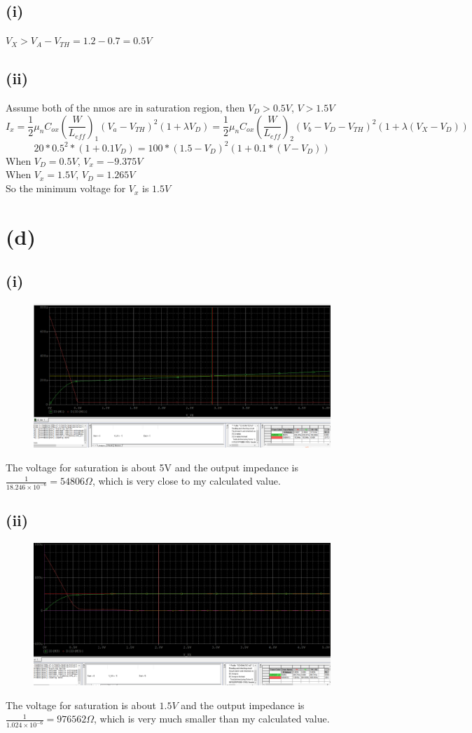 \documentclass[12pt]{article}
\begin{document}
\subsection{(i)}
$V_X>V_A-V_{TH}=1.2-0.7=0.5V$
\subsection{(ii)}
Assume both of the nmos are in saturation region, then $V_D>0.5V$, $V>1.5V$
$$I_x=\frac{1}{2}\mu_nC_{ox}(\frac{W}{L_{eff}})_1(V_{a}-V_{TH})^2(1+\lambda V_D)=\frac{1}{2}\mu_nC_{ox}(\frac{W}{L_{eff}})_2(V_{b}-V_{D}-V_{TH})^2(1+\lambda (V_X-V_D))$$
$$20*0.5^2*(1+0.1V_D)=100*(1.5-V_D)^2(1+0.1*(V-V_D))$$
When $V_D=0.5V$, $V_x=-9.375V$
\\ When $V_x=1.5V$, $V_D=1.265V$
\\ So the minimum voltage for $V_x$ is $1.5V$
\section{(d)}
\subsection{(i)}
\begin{figure}[H]
\centering
\includegraphics[scale=0.25]{P1.png}
\end{figure}
The voltage for saturation is about 5V and the output impedance is $\frac{1}{18.246\times10^{-6}}=54806\Omega$, which is very close to my calculated value.
\subsection{(ii)}
\begin{figure}[H]
\centering
\includegraphics[scale=0.25]{P2.png}
\end{figure}
The voltage for saturation is about $1.5V$ and the output impedance is $\frac{1}{1.024\times10^{-6}}=976562\Omega$, which is very much smaller than my calculated value.
\end{document}
